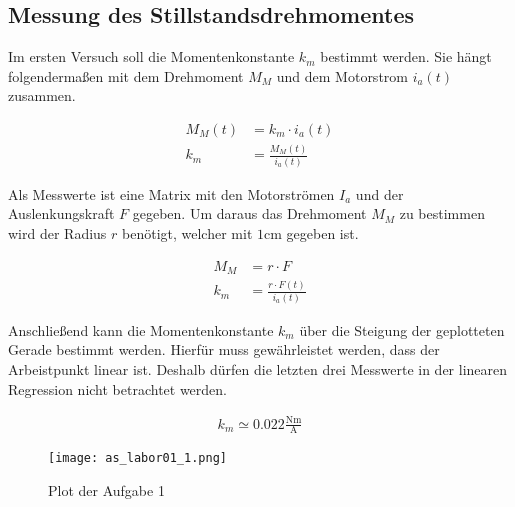 \subsection{Messung des Stillstandsdrehmomentes}

Im ersten Versuch soll die Momentenkonstante $k_m$ bestimmt werden.
Sie hängt folgendermaßen mit dem Drehmoment $M_M$ und dem Motorstrom $i_a(t)$
zusammen. 

\begin{equation} \label{eq111}
    \begin{split}
        M_M(t)&=k_m \cdot i_a(t)\\
        k_m&=\frac{M_M(t)}{i_a(t)}
    \end{split}
\end{equation}

Als Messwerte ist eine Matrix mit den Motorströmen $I_a$ und der Auslenkungskraft $F$
gegeben. Um daraus das Drehmoment $M_M$ zu bestimmen wird der Radius $r$ benötigt,
welcher mit $1 \mathrm{cm}$ gegeben ist.

\begin{equation} \label{eq112}
    \begin{split}
        M_M&=r \cdot F \\
        k_m&=\frac{r\cdot F(t)}{i_a(t)}
    \end{split}
\end{equation}

Anschließend kann die Momentenkonstante $k_m$ über die Steigung der geplotteten
Gerade bestimmt werden. Hierfür muss gewährleistet werden, dass der Arbeistpunkt
linear ist. Deshalb dürfen die letzten drei Messwerte in der linearen Regression
nicht betrachtet werden.

\begin{equation} \label{eq113}
    \begin{split}
        k_m\simeq 0.022 \mathrm{\frac{Nm}{A}}
    \end{split}
\end{equation}

\begin{figure}[H]
 \centering
 \texttt{[image: as\_labor01\_1.png]}
 \caption{Plot der Aufgabe 1}
 \label{fig:PlotAufgabe1}
\end{figure}